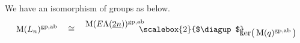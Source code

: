 \documentclass{amsbook} %
\newcommand{\mb}{\mathbf}
\newcommand{\bigquotient}[2]{ \raisebox{0.75\height}{$#1$} \mkern-12mu\scalebox{2}{$\diagup$}\mkern-10mu \raisebox{-0.5\height}{$#2$} }
\newcommand{\ELnn}{E\Lambda(\underline{2n})}
\newcommand{\moncat}{\ensuremath{\mb{MonCat}}}
\numberwithin{section}{chapter}
\begin{document}
\begin{cor}\label{M_coker}
We have an isomorphism of groups as below.
\[ \mathrm{M}(L_n)^{\mathrm{gp},\mathrm{ab}} \quad \cong \quad \bigquotient{\mathrm{M}(\ELnn)^{\mathrm{gp},\mathrm{ab}}}{\mathrm{ker}\big( \, \mathrm{M}(q)^{\mathrm{gp},\mathrm{ab}} \, \big)} \]
\end{cor}
%
%
%
\end{document}

